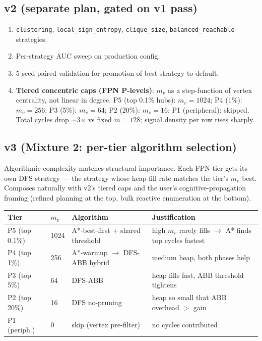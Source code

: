 \documentclass[11pt,a4paper]{article}
\begin{document}
\subsection*{v2 (separate plan, gated on v1 pass)}
\begin{enumerate}
\item \texttt{clustering}, \texttt{local\_sign\_entropy},
  \texttt{clique\_size}, \texttt{balanced\_reachable} strategies.
\item Per-strategy AUC sweep on production config.
\item 5-seed paired validation for promotion of best strategy to
  default.
\item \textbf{Tiered concentric caps (FPN P-levels)}:
  $m_v$ as a step-function of vertex centrality, not linear in
  degree.  P5 (top 0.1\% hubs): $m_v{=}1024$; P4 (1\%): $m_v{=}256$;
  P3 (5\%): $m_v{=}64$; P2 (20\%): $m_v{=}16$; P1 (peripheral):
  skipped.  Total cycles drop $\sim$3$\times$ vs fixed $m{=}128$;
  signal density per row rises sharply.
\end{enumerate}

\subsection*{v3 (Mixture 2: per-tier algorithm selection)}
Algorithmic complexity matches structural importance.  Each FPN tier
gets its own DFS strategy --- the strategy whose heap-fill rate
matches the tier's $m_v$ best.  Composes naturally with v2's tiered
caps and the user's cognitive-propagation framing (refined planning
at the top, bulk reactive enumeration at the bottom).

\begin{center}
\begin{tabular}{llll}
\toprule
Tier & $m_v$ & Algorithm & Justification \\
\midrule
P5 (top 0.1\%) & 1024 & A*-best-first + shared threshold & high $m_v$ rarely fills $\to$ A* finds top cycles fastest \\
P4 (top 1\%)   & 256  & A*-warmup $\to$ DFS-ABB hybrid    & medium heap, both phases help \\
P3 (top 5\%)   & 64   & DFS-ABB                           & heap fills fast, ABB threshold tightens \\
P2 (top 20\%)  & 16   & DFS no-pruning                    & heap so small that ABB overhead $>$ gain \\
P1 (periph.)   & 0    & skip (vertex pre-filter)          & no cycles contributed \\
\bottomrule
\end{tabular}
\end{center}
\end{document}

